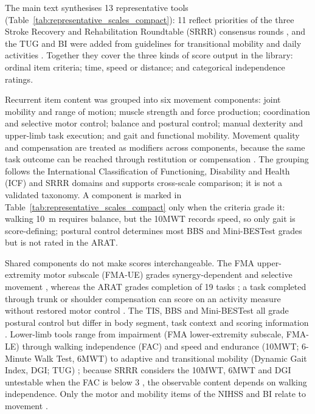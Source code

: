 \documentclass[11pt]{article}
\begin{document}
The main text synthesises 13 representative tools (Table~\ref{tab:representative_scales_compact}): 11 reflect priorities of the three Stroke Recovery and Rehabilitation Roundtable (SRRR) consensus rounds \cite{CoreKwakkel2017SRRRSensorimotor,CoreKwakkel2019SRRRUpperLimb,CoreVanCriekinge2024SRRRBalanceMobility}, and the TUG and BI were added from guidelines for transitional mobility and daily activities \cite{S1Winstein2016AHAASARehab,S1VADoD2024StrokeRehab}. Together they cover the three kinds of score output in the library: ordinal item criteria; time, speed or distance; and categorical independence ratings.

Recurrent item content was grouped into six movement components: joint mobility and range of motion; muscle strength and force production; coordination and selective motor control; balance and postural control; manual dexterity and upper-limb task execution; and gait and functional mobility. Movement quality and compensation are treated as modifiers across components, because the same task outcome can be reached through restitution or compensation \cite{Levin2009RecoveryCompensation,CoreKwakkel2019SRRRUpperLimb}. The grouping follows the International Classification of Functioning, Disability and Health (ICF) and SRRR domains \cite{WHO2001ICF,Cieza2019ICFLinking,CoreKwakkel2017SRRRSensorimotor} and supports cross-scale comparison; it is not a validated taxonomy. A component is marked in Table~\ref{tab:representative_scales_compact} only when the criteria grade it: walking 10~m requires balance, but the 10MWT records speed, so only gait is score-defining; postural control determines most BBS and Mini-BESTest grades but is not rated in the ARAT.

Shared components do not make scores interchangeable. The FMA upper-extremity motor subscale (FMA-UE) grades synergy-dependent and selective movement \cite{ScaleFuglMeyer1975PhysicalPerformance,ScaleSee2013StandardizedFMA}, whereas the ARAT grades completion of 19 tasks \cite{ScaleYozbatiran2008StandardizedARAT}; a task completed through trunk or shoulder compensation can score on an activity measure without restored motor control \cite{Levin2009RecoveryCompensation,Santisteban2016UpperLimbOutcome}. The TIS, BBS and Mini-BESTest all grade postural control but differ in body segment, task context and scoring information \cite{ScaleVerheyden2004TIS,ScaleBerg1992BalanceValidation,ScaleFranchignoni2010MiniBESTest}. Lower-limb tools range from impairment (FMA lower-extremity subscale, FMA-LE) through walking independence (FAC) and speed and endurance (10MWT; 6-Minute Walk Test, 6MWT) to adaptive and transitional mobility (Dynamic Gait Index, DGI; TUG) \cite{ScaleHolden1984FAC,ScaleCheng2020StrokeWalkTests,ScaleAn2017DGIStroke,ScaleNg2005TUGStroke}; because SRRR considers the 10MWT, 6MWT and DGI untestable when the FAC is below 3 \cite{CoreVanCriekinge2024SRRRBalanceMobility}, the observable content depends on walking independence. Only the motor and mobility items of the NIHSS and BI relate to movement \cite{ScaleBrott1989NIHSS,ScaleMahoney1965Barthel}.
\end{document}
